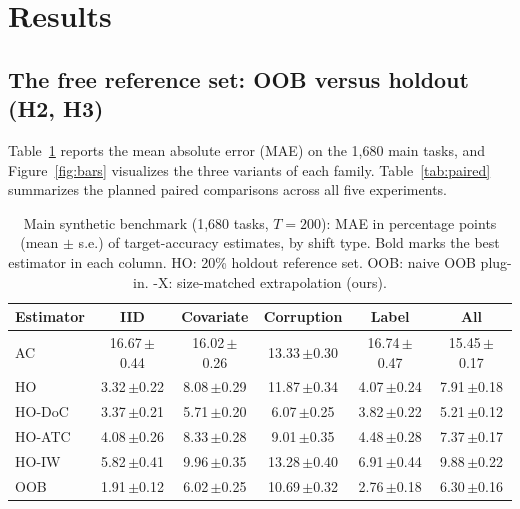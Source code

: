 \section{Results}
\label{sec:results}

\subsection{The free reference set: OOB versus holdout (H2, H3)}

Table~\ref{tab:main} reports the mean absolute error (MAE) on the 1{,}680 main tasks, and Figure~\ref{fig:bars} visualizes the three variants of each family. Table~\ref{tab:paired} summarizes the planned paired comparisons across all five experiments.

\begin{table}[t]
\centering\small
\caption{Main synthetic benchmark (1{,}680 tasks, $T=200$): MAE in percentage points (mean $\pm$ s.e.) of target-accuracy estimates, by shift type. Bold marks the best estimator in each column. HO: 20\% holdout reference set. OOB: naive OOB plug-in. -X: size-matched extrapolation (ours).}
\label{tab:main}
\begin{tabular}{lccccc}
\toprule
Estimator & IID & Covariate & Corruption & Label & All\\
\midrule
AC & 16.67\,\scriptsize{$\pm$0.44} & 16.02\,\scriptsize{$\pm$0.26} & 13.33\,\scriptsize{$\pm$0.30} & 16.74\,\scriptsize{$\pm$0.47} & 15.45\,\scriptsize{$\pm$0.17} \\
HO & 3.32\,\scriptsize{$\pm$0.22} & 8.08\,\scriptsize{$\pm$0.29} & 11.87\,\scriptsize{$\pm$0.34} & 4.07\,\scriptsize{$\pm$0.24} & 7.91\,\scriptsize{$\pm$0.18} \\
HO\mbox{-}DoC & 3.37\,\scriptsize{$\pm$0.21} & 5.71\,\scriptsize{$\pm$0.20} & 6.07\,\scriptsize{$\pm$0.25} & 3.82\,\scriptsize{$\pm$0.22} & 5.21\,\scriptsize{$\pm$0.12} \\
HO\mbox{-}ATC & 4.08\,\scriptsize{$\pm$0.26} & 8.33\,\scriptsize{$\pm$0.28} & 9.01\,\scriptsize{$\pm$0.35} & 4.48\,\scriptsize{$\pm$0.28} & 7.37\,\scriptsize{$\pm$0.17} \\
HO\mbox{-}IW & 5.82\,\scriptsize{$\pm$0.41} & 9.96\,\scriptsize{$\pm$0.35} & 13.28\,\scriptsize{$\pm$0.40} & 6.91\,\scriptsize{$\pm$0.44} & 9.88\,\scriptsize{$\pm$0.22} \\
OOB & 1.91\,\scriptsize{$\pm$0.12} & 6.02\,\scriptsize{$\pm$0.25} & 10.69\,\scriptsize{$\pm$0.32} & 2.76\,\scriptsize{$\pm$0.18} & 6.30\,\scriptsize{$\pm$0.16} \\

\end{tabular}
\end{table}
